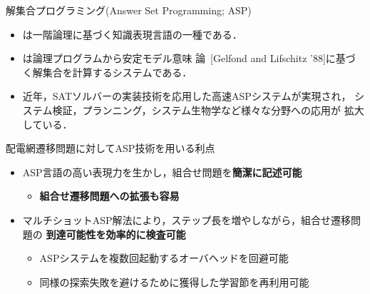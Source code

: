 \documentclass[dvipdfmx,11pt]{beamer}
\begin{document}
\begin{frame}{解集合プログラミング(Answer Set Programming; ASP)}
\vfill
 \begin{itemize}
  \item {}は一階論理に基づく知識表現言語の一種である．
  \item {}は論理プログラムから安定モデル意味
        論~[Gelfond and Lifschitz '88]に基づく解集合を計算するシステムである．
  \item 近年，SATソルバーの実装技術を応用した高速ASPシステムが実現され，
        システム検証，プランニング，システム生物学など様々な分野への応用が
        拡大している．
 \end{itemize}
 \vfill
 \begin{alertblock}{配電網遷移問題に対してASP技術を用いる利点}
  \begin{itemize}
   \item ASP言語の高い表現力を生かし，組合せ問題を\textbf{簡潔に記述可能}
         \begin{itemize}
          \item \alert{\bf 組合せ遷移問題への拡張も容易}
         \end{itemize}
   \item マルチショットASP解法により，ステップ長を増やしながら，組合せ遷移問題の
         \alert{\bf 到達可能性を効率的に検査可能}
         \begin{itemize}
          \item ASPシステムを複数回起動するオーバヘッドを回避可能
          \item 同様の探索失敗を避けるために獲得した学習節を再利用可能
         \end{itemize}
  \end{itemize}
 \end{alertblock} \vfill
\end{frame}
\end{document}
